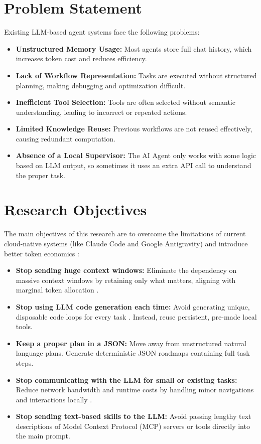 \documentclass[12pt,a4paper]{article}
\begin{document}
\section{Problem Statement}
Existing LLM-based agent systems face the following problems:
\begin{itemize}
    \item \textbf{Unstructured Memory Usage:} Most agents store full chat history, which increases token cost and reduces efficiency.
    \item \textbf{Lack of Workflow Representation:} Tasks are executed without structured planning, making debugging and optimization difficult.
    \item \textbf{Inefficient Tool Selection:} Tools are often selected without semantic understanding, leading to incorrect or repeated actions.
    \item \textbf{Limited Knowledge Reuse:} Previous workflows are not reused effectively, causing redundant computation.
    \item \textbf{Absence of a Local Supervisor:} The AI Agent only works with some logic based on LLM output, so sometimes it uses an extra API call to understand the proper task.
\end{itemize}

\section{Research Objectives}
The main objectives of this research are to overcome the limitations of current cloud-native systems (like Claude Code and Google Antigravity) and introduce better token economics \cite{token_economics, ai_tokenomics}:
\begin{itemize}
    \item \textbf{Stop sending huge context windows:} Eliminate the dependency on massive context windows by retaining only what matters, aligning with marginal token allocation \cite{marginal_token}.
    \item \textbf{Stop using LLM code generation each time:} Avoid generating unique, disposable code loops for every task \cite{claude_code_dive}. Instead, reuse persistent, pre-made local tools.
    \item \textbf{Keep a proper plan in a JSON:} Move away from unstructured natural language plans. Generate deterministic JSON roadmaps containing full task steps.
    \item \textbf{Stop communicating with the LLM for small or existing tasks:} Reduce network bandwidth and runtime costs by handling minor navigations and interactions locally \cite{efficient_agents}.
    \item \textbf{Stop sending text-based skills to the LLM:} Avoid passing lengthy text descriptions of Model Context Protocol (MCP) servers or tools directly into the main prompt.
\end{itemize}
\end{document}
